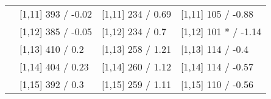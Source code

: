 \begin{table}
\begin{tabular}[t]{llll}
 & {}[1,11] 393  / -0.02 & {}[1,11] 234  / 0.69 & {}[1,11] 105  / -0.88\\
 & {}[1,12] 385  / -0.05 & {}[1,12] 234  / 0.7 & {}[1,12] 101 * / -1.14\\
\addlinespace
 & {}[1,13] 410  / 0.2 & {}[1,13] 258  / 1.21 & {}[1,13] 114  / -0.4\\
 & {}[1,14] 404  / 0.23 & {}[1,14] 260  / 1.12 & {}[1,14] 114  / -0.57\\
 & {}[1,15] 392  / 0.3 & {}[1,15] 259  / 1.11 & {}[1,15] 110  / -0.56\\
\bottomrule
\end{tabular}
\end{table}
